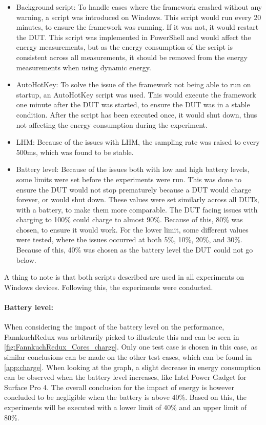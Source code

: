 \begin{itemize}
    \item Background script: To handle cases where the framework crashed without any warning, a script was introduced on Windows. This script would run every 20 minutes, to ensure the framework was running. If it was not, it would restart the DUT. This script was implemented in PowerShell and would affect the energy measurements, but as the energy consumption of the script is consistent across all measurements, it should be removed from the energy measurements when using dynamic energy.
    \item AutoHotKey: To solve the issue of the framework not being able to run on startup, an AutoHotKey script was used. This would execute the framework one minute after the DUT was started, to ensure the DUT was in a stable condition. After the script has been executed once, it would shut down, thus not affecting the energy consumption during the experiment.
    \item LHM: Because of the issues with LHM, the sampling rate was raised to every $500$ms, which was found to be stable.
    \item Battery level: Because of the issues both with low and high battery levels, some limits were set before the experiments were run. This was done to ensure the DUT would not stop prematurely because a DUT would charge forever, or would shut down. These values were set similarly across all DUTs, with a battery, to make them more comparable. The DUT facing issues with charging to 100\% could charge to almost 90\%. Because of this, 80\% was chosen, to ensure it would work. For the lower limit, some different values were tested, where the issues occurred at both 5\%, 10\%, 20\%, and 30\%. Because of this, 40\% was chosen as the battery level the DUT could not go below.
\end{itemize}

A thing to note is that both scripts described are used in all experiments on Windows devices. Following this, the experiments were conducted.



\paragraph{Battery level:} When considering the impact of the battery level on the performance, FannkuchRedux was arbitrarily picked to illustrate this and can be seen in \cref{fig:FannkuchRedux_Cores_charge}. Only one test case is chosen in this case, as similar conclusions can be made on the other test cases, which can be found in \cref{app:charge}. When looking at the graph, a slight decrease in energy consumption can be observed when the battery level increases, like Intel Power Gadget for Surface Pro 4. The overall conclusion for the impact of energy is however concluded to be negligible when the battery is above 40\%. Based on this, the experiments will be executed with a lower limit of 40\% and an upper limit of 80\%.

